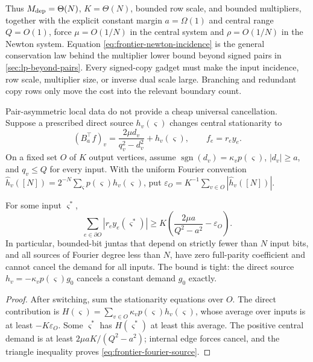 Thus \(M_{\rm dep}=\Theta(N)\), \(K=\Theta(N)\), bounded row scale, and
bounded multipliers, together with the explicit constant margin
\(a=\Omega(1)\) and central range \(Q=O(1)\), force
\(\mu=O(1/N)\) in the central system and \(\rho=O(1/N)\) in the Newton
system.  Equation
\eqref{eq:frontier-newton-incidence} is the general conservation law behind
the multiplier lower bound beyond signed pairs in \cref{sec:lp-beyond-pairs}.
Every signed-copy gadget must make the input incidence, row scale,
multiplier size, or inverse dual scale large.  Branching and redundant copy
rows only move the cost into the relevant boundary count.

Pair-asymmetric local data do not provide a cheap universal cancellation.
Suppose a prescribed direct source \(h_v(\varsigma)\) changes central
stationarity to
\[
 (B_a^\top f)_v=
 \frac{2\mu d_v}{q_v^2-d_v^2}+h_v(\varsigma),
 \qquad f_e=r_ey_e.
\]
On a fixed set \(O\) of \(K\) output vertices, assume
\(\operatorname{sgn}(d_v)=\kappa_vp(\varsigma)\),
\(|d_v|\geq a\), and \(q_v\leq Q\) for every input.  With the uniform
Fourier convention
\(\widehat h_v([N])=2^{-N}\sum_\varsigma p(\varsigma)h_v(\varsigma)\), put
\(\varepsilon_O=K^{-1}\sum_{v\in O}|\widehat h_v([N])|\).

\begin{theorem}
\label{thm:frontier-fourier-source}
For some input \(\varsigma^*\),
\begin{equation}
 \sum_{e\in\partial O}|r_ey_e(\varsigma^*)|
 \geq K\left(\frac{2\mu a}{Q^2-a^2}-\varepsilon_O\right).
 \label{eq:frontier-fourier-source}
\end{equation}
In particular, bounded-bit juntas that depend on strictly fewer than \(N\)
input bits, and all sources of Fourier degree less than \(N\), have zero
full-parity coefficient and cannot cancel the demand for all inputs.  The
bound is tight: the direct source
\(h_v=-\kappa_vp(\varsigma)g_0\) cancels a constant demand \(g_0\) exactly.
\end{theorem}

\begin{proof}
After switching, sum the stationarity equations over \(O\).  The direct
contribution is
\(H(\varsigma)=\sum_{v\in O}\kappa_vp(\varsigma)h_v(\varsigma)\), whose
average over inputs is at least \(-K\varepsilon_O\).  Some \(\varsigma^*\) has
\(H(\varsigma^*)\) at least this average.  The positive central demand is at
least \(2\mu aK/(Q^2-a^2)\); internal edge forces cancel, and the triangle
inequality proves \eqref{eq:frontier-fourier-source}.
\end{proof}

